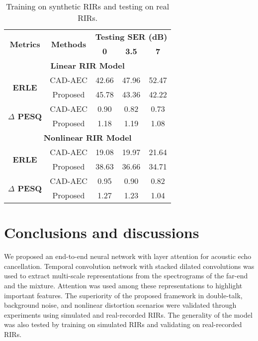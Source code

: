 \documentclass{article}
\begin{document}
\begin{sloppy}
\begin{table}[htb]
\setlength{\abovecaptionskip}{0.2cm}
\setlength{\belowcaptionskip}{0.2cm}
\centering
\caption{Training on synthetic RIRs and testing on real RIRs.}
\label{tab:generalization}
\begin{tabular}{|c|c|c|c|c|}
\hline
\multirow{2}{*}{\textbf{Metrics}}   & \multirow{2}{*}{\textbf{Methods}} & \multicolumn{3}{l|}{\textbf{Testing SER (dB)}} \\ \cline{3-5}
                      &       & \textbf{0}     & \textbf{3.5}    & \textbf{7}           \\ \hline \hline
\multicolumn{5}{|c|}{\textbf{Linear RIR Model}}  \\ \hline \hline
\multirow{2}{*}{\textbf{ERLE}} & CAD-AEC & 42.66   & 47.96   & 52.47  \\ \cline{2-5}
                      & Proposed  & 45.78    & 43.36    & 42.22       \\ \hline
\multirow{2}{*}{\textbf{$\Delta$ PESQ}} & CAD-AEC   & 0.90  & 0.82  & 0.73  \\ \cline{2-5}
                      & Proposed  & 1.18   & 1.19   & 1.08  \\ \hline \hline
\multicolumn{5}{|c|}{\textbf{Nonlinear RIR Model}}  \\ \hline \hline
\multirow{2}{*}{\textbf{ERLE}} & CAD-AEC & 19.08   & 19.97   & 21.64  \\ \cline{2-5}
                      & Proposed  & 38.63   & 36.66  & 34.71  \\ \hline
\multirow{2}{*}{\textbf{$\Delta$ PESQ}} & CAD-AEC  & 0.95   & 0.90    & 0.82  \\ \cline{2-5}
                      & Proposed  & 1.27   & 1.23   & 1.04   \\ \hline
\end{tabular}
\end{table}


\section{Conclusions and discussions}
We proposed an end-to-end neural network with layer attention for acoustic echo cancellation. Temporal convolution network with stacked dilated convolutions was used to extract multi-scale representations from the spectrograms of the far-end and the mixture. Attention was used among these representations to highlight important features.
The superiority of the proposed framework in double-talk, background noise, and nonlinear distortion scenarios were validated through experiments using simulated and real-recorded RIRs. The generality of the model was also tested by training on simulated RIRs and validating on real-recorded RIRs.


\end{sloppy}
\end{document}
